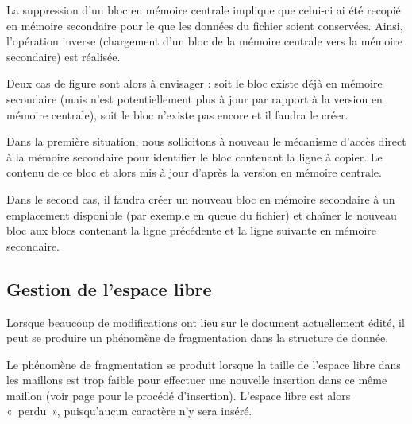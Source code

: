La suppression d'un bloc en mémoire centrale implique que celui-ci ai été
recopié en mémoire secondaire pour le que les données du fichier soient
conservées. Ainsi, l'opération inverse (chargement d'un bloc de la mémoire
centrale vers la mémoire secondaire) est réalisée.

Deux cas de figure sont alors à envisager : soit le bloc existe déjà en mémoire
secondaire (mais n'est potentiellement plus à jour par rapport à la version en
mémoire centrale), soit le bloc n'existe pas encore et il faudra le créer.

Dans la première situation, nous sollicitons à nouveau le mécanisme d'accès
direct à la mémoire secondaire pour identifier le bloc contenant la ligne à
copier. Le contenu de ce bloc et alors mis à jour d'après la version en mémoire
centrale.

Dans le second cas, il faudra créer un nouveau bloc en mémoire secondaire à un
emplacement disponible (par exemple en queue du fichier) et chaîner le nouveau
bloc aux blocs contenant la ligne précédente et la ligne suivante en mémoire
secondaire.


\subsection{Gestion de l'espace libre}
	\label{subsec:gestionespacelibre}
Lorsque beaucoup de modifications ont lieu sur le document actuellement édité,
il peut se produire un phénomène de fragmentation dans la structure de
donnée.

Le phénomène de fragmentation se produit lorsque la taille de l'espace libre
dans les maillons est trop faible pour effectuer une nouvelle insertion dans ce
même maillon (voir page \pageref{sec:structurationligne} pour le procédé
d'insertion). L'espace libre est alors «~perdu~», puisqu'aucun caractère n'y
sera inséré.

